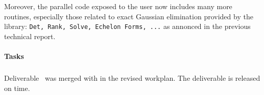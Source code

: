 Moreover, the parallel code exposed to the user now includes many more routines, especially those related to exact
Gaussian elimination provided by the \fflasffpack library: \texttt{Det, Rank, Solve, Echelon Forms, ...} as annonced in
the previous technical report.


\paragraph{Tasks}

\medskip
\subparagraph{}
Deliverable~ was merged with
 in the revised workplan. The deliverable
 is released on time.


